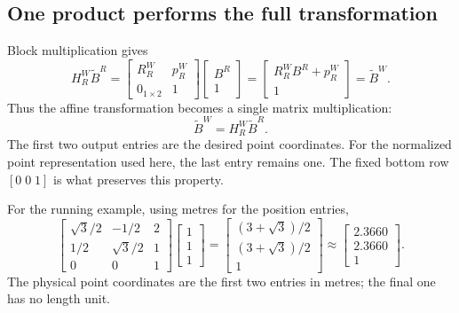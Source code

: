 \subsection{One product performs the full transformation}
Block multiplication gives
\begin{equation}
 H_R^W\widetilde B^R
 =\begin{bmatrix}R_R^W&p_R^W\\0_{1\times2}&1\end{bmatrix}
 \begin{bmatrix}B^R\\1\end{bmatrix}
 =\begin{bmatrix}R_R^W B^R+p_R^W\\1\end{bmatrix}
 =\widetilde B^W.
\end{equation}
Thus the affine transformation becomes a single matrix multiplication:
\begin{equation}
 \boxed{\widetilde B^W=H_R^W\widetilde B^R.}
 \label{eq:l03-homogeneous-map}
\end{equation}
The first two output entries are the desired point coordinates. For the
normalized point representation used here, the last entry remains one.
The fixed bottom row $[0\;0\;1]$ is what preserves this property.

For the running example, using metres for the position entries,
\[
 \begin{bmatrix}\sqrt3/2&-1/2&2\\1/2&\sqrt3/2&1\\0&0&1\end{bmatrix}
 \begin{bmatrix}1\\1\\1\end{bmatrix}
 =\begin{bmatrix}(3+\sqrt3)/2\\(3+\sqrt3)/2\\1\end{bmatrix}
 \approx\begin{bmatrix}2.3660\\2.3660\\1\end{bmatrix}.
\]
The physical point coordinates are the first two entries in metres; the final
one has no length unit.


